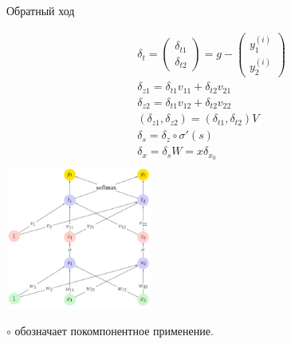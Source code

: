 \documentclass{report}
\begin{document}
\newpage
\par Обратный ход

\begin{multicols}{2}
\begin{align*}
    & \delta_t = \begin{pmatrix} \delta_{t1} \\ \delta_{t2} \end{pmatrix} = g - \begin{pmatrix} y_1^{(i)} \\ y_2^{(i)} \end{pmatrix} \\
    & \delta_{z1} = \delta_{t1} v_{11} + \delta_{t2} v_{21} \\
    & \delta_{z2} = \delta_{t1} v_{12} + \delta_{t2} v_{22} \\
    & (\delta_{z1}, \delta_{z2}) = (\delta_{t1}, \delta_{t2}) V \\
    & \delta_s = \delta_z \circ \sigma'(s) \\
    & \delta_x = \delta_s W = x \delta_{x_0} \\
\end{align*}
\columnbreak
\includegraphics[width=0.36\textwidth]{exam/net.png}
\end{multicols}

\par $\circ$ обозначает покомпонентное применение.
\end{document}
